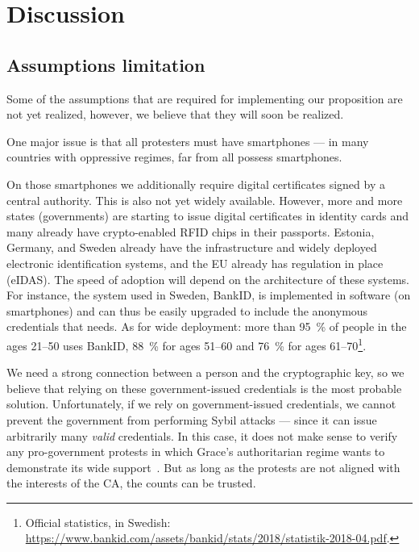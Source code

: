 \section{Discussion}%
\label{Discussion}

\subsection{Assumptions limitation} 

Some of the assumptions that are required for implementing our proposition are 
not yet realized, however, we believe that they will soon be realized.

One major issue is that all protesters must have smartphones --- in many 
countries with oppressive regimes, far from all possess smartphones.

On those smartphones we additionally require digital certificates signed by a 
central authority.
This is also not yet widely available.
However, more and more states (governments) are starting to issue digital 
certificates in identity cards and many already have crypto-enabled RFID chips 
in their passports.
\Eg Estonia, Germany, and Sweden already have the infrastructure and widely 
deployed electronic identification systems, and the EU already has regulation 
in place (eIDAS).
The speed of adoption will depend on the architecture of these systems.
For instance, the system used in Sweden, BankID, is implemented in software (on 
smartphones) and can thus be easily upgraded to include the anonymous 
credentials that \CROCUS needs.
As for wide deployment: more than \SI{95}{\%} of people in the ages 21--50 uses 
BankID, \SI{88}{\%} for ages 51--60 and \SI{76}{\%} for ages 
61--70\footnote{%
  Official statistics, in Swedish:  
  \url{https://www.bankid.com/assets/bankid/stats/2018/statistik-2018-04.pdf}.
}.

We need a strong connection between a person and the cryptographic key, so we 
believe that relying on these government-issued credentials is the most 
probable solution.
Unfortunately, if we rely on government-issued credentials, we cannot prevent 
the government from performing Sybil attacks --- since it can issue arbitrarily 
many \emph{valid} credentials.
In this case, it does not make sense to verify any pro-government protests in 
which Grace's authoritarian regime wants to demonstrate its wide 
support~\cite{AlJazeeraOnVenezuela2017,VenezuelanStateWorkersCalledToParticipate}.
But as long as the protests are not aligned with the interests of the \ac{CA}, 
the counts can be trusted.

